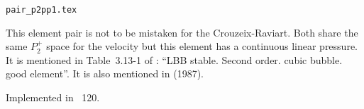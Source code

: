 \begin{flushright} {\tiny {\color{gray} \tt  pair\_p2pp1.tex}} \end{flushright}

This element pair is not to be mistaken for the Crouzeix-Raviart. Both share the same $P_2^+$ space
for the velocity but this element has a continuous linear pressure.  
It is mentioned in Table~3.13-1 of \textcite{grsa}: ``LBB stable. Second order. cubic bubble. good element''.
It is also mentioned in \textcite{sofo87} (1987).

Implemented in \stone~120.
